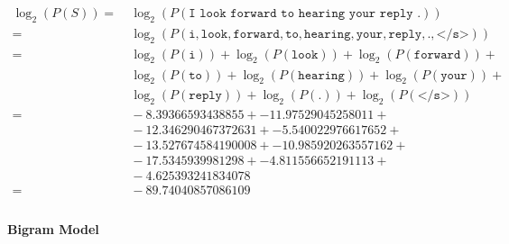 \documentclass{article}
\begin{document}
\begin{equation}
\begin{split}
\log_{2} (P(S)) =&\ \log_{2} (P(\texttt{I look forward to hearing your reply .})) \\ =&\ \log_{2} (P(\texttt{i}, \texttt{look}, \texttt{forward}, \texttt{to}, \texttt{hearing}, \texttt{your}, \texttt{reply}, \texttt{.}, \texttt{</s>})) \\ =&\ \log_{2} (P(\texttt{i})) + \log_{2} (P(\texttt{look})) + \log_{2} (P(\texttt{forward})) + \\ &\  \log_{2} (P(\texttt{to})) + \log_{2} (P(\texttt{hearing})) + \log_{2} (P(\texttt{your})) + \\ &\  \log_{2} (P(\texttt{reply})) + \log_{2} (P(\texttt{.})) + \log_{2} (P(\texttt{</s>})) \\ =&\ -8.39366593438855 + -11.97529045258011 +\\ &\ -12.346290467372631 + -5.540022976617652 + \\ &\ -13.527674584190008 + -10.985920263557162 + \\ &\ -17.5345939981298 + -4.811556652191113 + \\ &\  -4.625393241834078 \\ =&\ -89.74040857086109 \\
\end{split}\end{equation}

\paragraph{Bigram Model}
\end{document}
